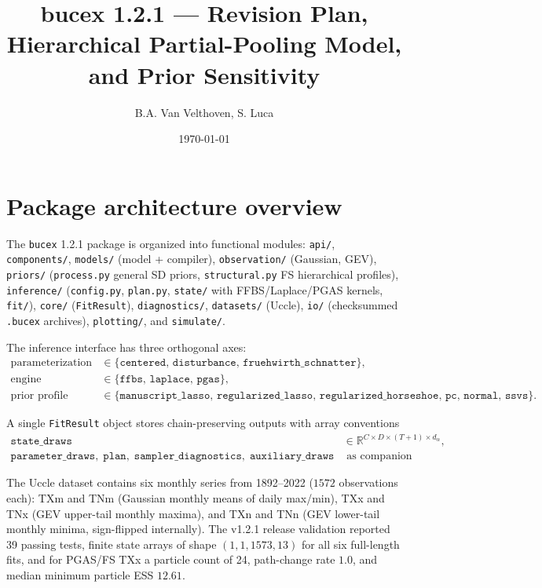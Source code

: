\documentclass[11pt]{article}
\title{bucex 1.2.1 --- Revision Plan, Hierarchical Partial-Pooling Model, and Prior Sensitivity}
\author{B.A. Van Velthoven, S. Luca}
\date{\today}
\begin{document}
\begin{titlepage}
\maketitle
\thispagestyle{empty}
\end{titlepage}

\tableofcontents
\newpage

\section{Package architecture overview}
The \texttt{bucex} 1.2.1 package is organized into functional modules: \texttt{api/}, \texttt{components/}, \texttt{models/} (model + compiler), \texttt{observation/} (Gaussian, GEV), \texttt{priors/} (\texttt{process.py} general SD priors, \texttt{structural.py} FS hierarchical profiles), \texttt{inference/} (\texttt{config.py}, \texttt{plan.py}, \texttt{state/} with FFBS/Laplace/PGAS kernels, \texttt{fit/}), \texttt{core/} (\texttt{FitResult}), \texttt{diagnostics/}, \texttt{datasets/} (Uccle), \texttt{io/} (checksummed \texttt{.bucex} archives), \texttt{plotting/}, and \texttt{simulate/}.

The inference interface has three orthogonal axes:
\begin{align}
\text{parameterization} &\in \{\texttt{centered},\,\texttt{disturbance},\,\texttt{fruehwirth\_schnatter}\}, \\
\text{engine} &\in \{\texttt{ffbs},\,\texttt{laplace},\,\texttt{pgas}\}, \\
\text{prior profile} &\in \{\texttt{manuscript\_lasso},\,\texttt{regularized\_lasso},\,\texttt{regularized\_horseshoe},\,\texttt{pc},\,\texttt{normal},\,\texttt{ssvs}\}.
\end{align}

A single \texttt{FitResult} object stores chain-preserving outputs with array conventions
\begin{align}
\texttt{state\_draws} &\in \mathbb{R}^{C \times D \times (T+1) \times d_\alpha}, \\
\texttt{parameter\_draws},\; \texttt{plan},\; \texttt{sampler\_diagnostics},\; \texttt{auxiliary\_draws} &\text{ as companion objects.}
\end{align}

The Uccle dataset contains six monthly series from 1892--2022 ($1572$ observations each): TXm and TNm (Gaussian monthly means of daily max/min), TXx and TNx (GEV upper-tail monthly maxima), and TXn and TNn (GEV lower-tail monthly minima, sign-flipped internally). The v1.2.1 release validation reported 39 passing tests, finite state arrays of shape $(1,1,1573,13)$ for all six full-length fits, and for PGAS/FS TXx a particle count of 24, path-change rate $1.0$, and median minimum particle ESS $12.61$.
\end{document}
